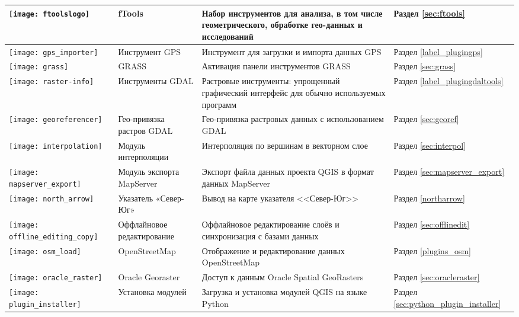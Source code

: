 {\begin{longtable}{|p{1.2cm}|p{3.8cm}|p{7.5cm}|p{3cm}|}
\hline
\texttt{[image: ftoolslogo]}
 & fTools \index{модули!fTools}& Набор инструментов для анализа, в том числе геометрического, обработке гео-данных и исследований & Раздел \ref{sec:ftools}\\
\hline
\texttt{[image: gps\_importer]}
 & Инструмент GPS \index{модули!GPS}& Инструмент для загрузки и импорта данных GPS & Раздел \ref{label_plugingps}\\
\hline
\texttt{[image: grass]}
 & GRASS \index{модули!инструменты GRASS} & Активация панели инструментов GRASS & Раздел \ref{sec:grass}\\
\hline
\texttt{[image: raster-info]}
 & Инструменты GDAL \index{модули!GdalTools} & Растровые инструменты: упрощенный графический интерфейс для обычно используемых программ & Раздел \ref{label_plugingdaltools}\\
\hline
\texttt{[image: georeferencer]}
 & Гео-привязка растров GDAL \index{модули!привязка} & Гео-привязка растровых данных с использованием GDAL & Раздел \ref{sec:georef}\\
\hline
\texttt{[image: interpolation]}
 & Модуль интерполяции \index{модули!интерполяция}& Интерполяция по вершинам в векторном слое & Раздел \ref{sec:interpol}\\
\hline
\texttt{[image: mapserver\_export]}
 & Модуль экспорта MapServer \index{модули!экспорт в MapServer}& Экспорт файла данных проекта QGIS в формат данных MapServer & Раздел \ref{sec:mapserver_export}\\
\hline
\texttt{[image: north\_arrow]}
 & Указатель «Север-Юг» \index{модули!стрелка севера}& Вывод на карте указателя <<Север-Юг>> & Раздел \ref{northarrow}\\
\hline
\texttt{[image: offline\_editing\_copy]}
 & Оффлайновое редактирование & Оффлайновое редактирование слоёв и синхронизация с базами данных & Раздел \ref{sec:offlinedit}\\
\texttt{[image: osm\_load]}
 & OpenStreetMap & Отображение и редактирование данных OpenStreetMap & Раздел \ref{plugins_osm}\\
\hline
\texttt{[image: oracle\_raster]}
 & Oracle Georaster \index{модули!georaster}& Доступ к данным  Oracle Spatial GeoRasters & Раздел \ref{sec:oracleraster}\\
\hline
\texttt{[image: plugin\_installer]}
 & Установка модулей \index{модули!Plugin Installer} & Загрузка и установка модулей QGIS на языке Python & Раздел \ref{sec:python_plugin_installer}\\

\end{longtable}}
